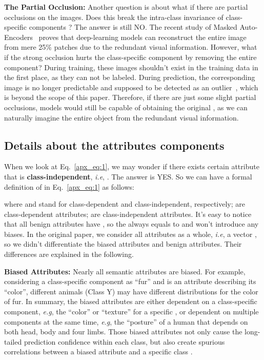 \documentclass{article}
\def\eg{\emph{e.g}} \def\Eg{\emph{E.g}}
\def\ie{\emph{i.e}} \def\Ie{\emph{I.e}}
\begin{document}
\textbf{The Partial Occlusion:} Another question is about what if there are partial occlusions on the images. Does this break the intra-class invariance of class-specific components ? The answer is still NO. The recent study of Masked Auto-Encoders~\cite{MaskedAutoencoders2021} proves that deep-learning models can reconstruct the entire image from mere 25\% patches due to the redundant visual information. However, what if the strong occlusion hurts the class-specific component  by removing the entire component? During training, these images shouldn't exist in the training data in the first place, as they can not be labeled. During prediction, the corresponding image is no longer predictable and supposed to be detected as an outlier~\cite{abdar2021review}, which is beyond the scope of this paper. Therefore, if there are just some slight partial occlusions, models would still be capable of obtaining the original , as we can naturally imagine the entire object from the redundant visual information.






\subsection{Details about the attributes components}
When we look at Eq.~\eqref{apx_eq:1}, we may wonder if there exists certain attribute  that is \textbf{class-independent}, \ie, . The answer is YES. So we can have a formal definition of  in Eq.~\eqref{apx_eq:1} as follows:

where  and  stand for class-dependent and class-independent, respectively;  are class-dependent attributes;  are class-independent attributes. It's easy to notice that all benign attributes have , so the  always equals to  and won't introduce any biases. In the original paper, we consider all attributes as a whole, \ie, a vector , so we didn't differentiate the biased attributes and benign attributes. Their differences are explained in the following.

\textbf{Biased Attributes:} Nearly all semantic attributes are biased. For example, considering a class-specific component  as ``fur'' and  is an attribute describing its ``color'', different animals (Class Y) may have different distributions for the color of fur. In summary, the biased attributes  are either dependent on a class-specific component, \eg, the ``color'' or ``texture'' for a specific , or dependent on multiple components at the same time, \eg, the ``posture'' of a human that depends on both head, body and four limbs. Those biased attributes not only cause the long-tailed prediction confidence within each class, but also create spurious correlations between a biased attribute  and a specific class . 
\end{document}
